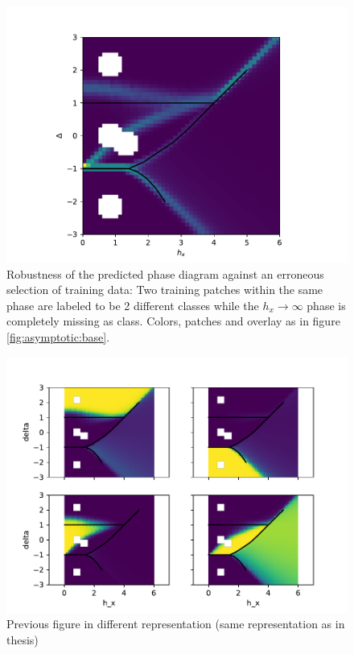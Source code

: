 \documentclass[prl, reprint, twocolumn]{revtex4-1}
\begin{document}
	\begin{figure}[h]
		\includegraphics[width=\columnwidth]{3_6_Weak4PhaseDetection2DEdges_334_20190119}
		
		\caption{Robustness of the predicted phase diagram against an erroneous selection of training data: Two training patches within the same phase are labeled to be 2 different classes while the $h_x \rightarrow \infty$ phase is completely missing as class. Colors, patches and overlay as in figure \ref{fig:asymptotic:base}.}
		\label{fig:asymptotic:wrongguess}
	\end{figure}
	\begin{figure}[h]
		\includegraphics[width=\columnwidth]{3_6_Weak4PhaseDetection2D_134_20190119}
		
		\caption{Previous figure in different representation (same representation as in thesis)}
	\end{figure}
\end{document}
